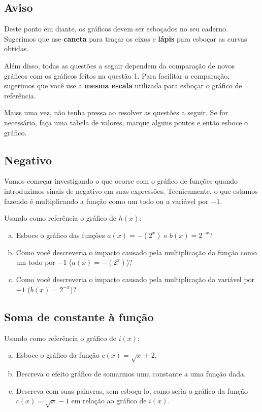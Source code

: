 \documentclass[main_estudante.tex]{subfiles}
\begin{document}
\subsection*{Aviso}

Deste ponto em diante, os gráficos devem ser esboçados no seu caderno. Sugerimos que use \textbf{caneta} para traçar os eixos e \textbf{lápis} para esboçar as curvas obtidas.

Além disso, todas as questões a seguir dependem da comparação de novos gráficos com os gráficos feitos na questão 1. Para facilitar a comparação, sugerimos que você use a \textbf{mesma escala} utilizada para esboçar o gráfico de referência.

Maiss uma vez, não tenha pressa ao resolver as questões a seguir. Se for necessário, faça uma tabela de valores, marque alguns pontos e então esboce o gráfico.

\subsection*{Negativo}

Vamos começar investigando o que ocorre com o gráfico de funções quando introduzimos sinais de negativo em suas expressões. Tecnicamente, o que estamos fazendo é multiplicando a função como um todo ou a variável por $-1$.

\begin{questao}
Usando como referência o gráfico de $h(x)$:
\begin{enumerate}[a)]
\item Esboce o gráfico das funções $a(x)=-(2^x)$ e $b(x)=2^{-x}$?
\item Como você descreveria o impacto causado pela multiplicação da função como um todo por $-1$ ($a(x)=-(2^x)$)?
\item Como você descreveria o impacto causado pela multiplicação da variável por $-1$ ($b(x)=2^{-x}$)?
\end{enumerate}
\end{questao}

\subsection*{Soma de constante à função}

\begin{questao}
Usando como referência o gráfico de $i(x)$:
\begin{enumerate}[a)]
\item Esboce o gráfico da função $c(x)=\sqrt{x}+2$.
\item Descreva o efeito gráfico de somarmos uma constante a uma função dada.
\item Descreva com suas palavras, sem esboça-lo, como seria o gráfico da função $c(x)=\sqrt{x}-1$ em relação ao gráfico de $i(x)$.
\end{enumerate}
\end{questao}
\end{document}
